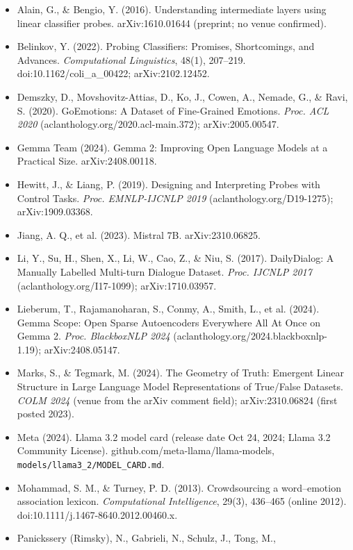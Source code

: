 \documentclass[
  10pt,
]{article}
\providecommand{\tightlist}{%
  \setlength{\itemsep}{0pt}\setlength{\parskip}{0pt}}
\begin{document}
\begin{itemize}
\tightlist
\item
  Alain, G., \& Bengio, Y. (2016). Understanding intermediate layers
  using linear classifier probes. arXiv:1610.01644 (preprint; no venue
  confirmed).
\item
  Belinkov, Y. (2022). Probing Classifiers: Promises, Shortcomings, and
  Advances. \emph{Computational Linguistics}, 48(1), 207--219.
  doi:10.1162/coli\_a\_00422; arXiv:2102.12452.
\item
  Demszky, D., Movshovitz-Attias, D., Ko, J., Cowen, A., Nemade, G., \&
  Ravi, S. (2020). GoEmotions: A Dataset of Fine-Grained Emotions.
  \emph{Proc. ACL 2020} (aclanthology.org/2020.acl-main.372);
  arXiv:2005.00547.
\item
  Gemma Team (2024). Gemma 2: Improving Open Language Models at a
  Practical Size. arXiv:2408.00118.
\item
  Hewitt, J., \& Liang, P. (2019). Designing and Interpreting Probes
  with Control Tasks. \emph{Proc. EMNLP-IJCNLP 2019}
  (aclanthology.org/D19-1275); arXiv:1909.03368.
\item
  Jiang, A. Q., et al. (2023). Mistral 7B. arXiv:2310.06825.
\item
  Li, Y., Su, H., Shen, X., Li, W., Cao, Z., \& Niu, S. (2017).
  DailyDialog: A Manually Labelled Multi-turn Dialogue Dataset.
  \emph{Proc. IJCNLP 2017} (aclanthology.org/I17-1099);
  arXiv:1710.03957.
\item
  Lieberum, T., Rajamanoharan, S., Conmy, A., Smith, L., et al. (2024).
  Gemma Scope: Open Sparse Autoencoders Everywhere All At Once on Gemma
  2. \emph{Proc. BlackboxNLP 2024}
  (aclanthology.org/2024.blackboxnlp-1.19); arXiv:2408.05147.
\item
  Marks, S., \& Tegmark, M. (2024). The Geometry of Truth: Emergent
  Linear Structure in Large Language Model Representations of True/False
  Datasets. \emph{COLM 2024} (venue from the arXiv comment field);
  arXiv:2310.06824 (first posted 2023).
\item
  Meta (2024). Llama 3.2 model card (release date Oct 24, 2024; Llama
  3.2 Community License). github.com/meta-llama/llama-models,
  \texttt{models/llama3\_2/MODEL\_CARD.md}.
\item
  Mohammad, S. M., \& Turney, P. D. (2013). Crowdsourcing a
  word--emotion association lexicon. \emph{Computational Intelligence},
  29(3), 436--465 (online 2012). doi:10.1111/j.1467-8640.2012.00460.x.
\item
  Panickssery (Rimsky), N., Gabrieli, N., Schulz, J., Tong, M.,

\end{itemize}
\end{document}
